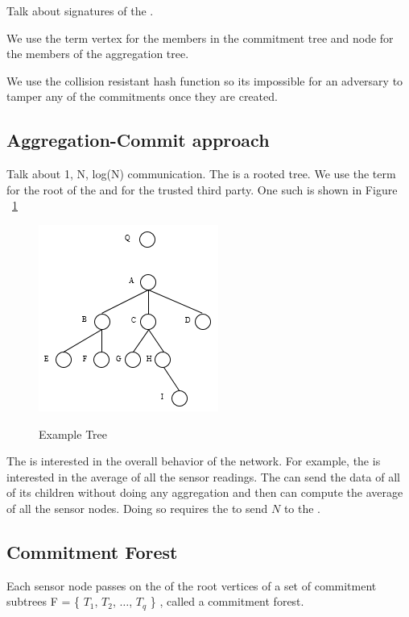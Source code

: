 	Talk about signatures of the \payloads.

	We use the term vertex for the members in the commitment tree and node for the members of the aggregation tree.
	
	We use the collision resistant hash function so its impossible for an adversary to tamper any of the commitments once they are created.

	\subsection{Aggregation-Commit approach}
		Talk about 1, N, log(N) communication.
		The \at is a rooted tree. We use the term \bs for the root of the \at and \q for the trusted third party. One such \at is shown in Figure ~\ref{fig:at}

		\begin{figure}[hp]
			\centering
			\includegraphics[scale = 1]{images/example-tree.png}\\
			\caption{Example Tree}
			\label{fig:at}
		\end{figure}

		The \q is interested in the overall behavior of the network. 
		For example, the \q is interested in the average of all the sensor readings. 
		The \bs can send the \q data of all of its children without doing any aggregation and then \q can compute the average of all the sensor nodes.
		Doing so requires the \bs to send $N$ \payloads to the \q. 
	
	\subsection{Commitment Forest}
		Each sensor node passes on the \payloads of the root vertices of a set of commitment subtrees F = \{ $T_{1}$, $T_{2}$, $\dotsc$, $T_{q}$ \} , called  a commitment forest.


